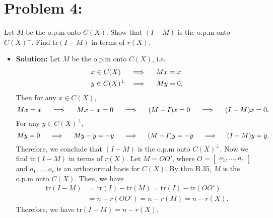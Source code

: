 \documentclass[11pt]{article}
\begin{document}
\section*{Problem 4:}
Let $M$ be the o.p.m onto $C(X)$.  Show that $(I-M)$ is the o.p.m onto $C(X)^\perp$.  Find tr$(I-M)$ in terms of $r(X)$.
\begin{itemize}
\item[] {\bf Solution:}  Let $M$ be the o.p.m onto $C(X)$, i.e. 
\begin{align*}
&x \in C(X) \hspace{5mm}\Longrightarrow\hspace{5mm} Mx = x \\
&y \in C(X)^\perp \hspace{3mm} \Longrightarrow\hspace{5mm} My = 0.
\end{align*}
Then for any $x\in C(X)$,
\[
Mx = x \hspace{5mm} \Longrightarrow\hspace{5mm} Mx - x = 0 \hspace{5mm}\Longrightarrow\hspace{5mm} (M-I)x = 0 \hspace{5mm}\Longrightarrow\hspace{5mm} (I-M)x=0.
\]
For any $y\in C(X)^\perp$,
\[
My = 0 \hspace{5mm} \Longrightarrow\hspace{5mm} My - y = -y \hspace{5mm} \Longrightarrow\hspace{5mm} (M-I)y = -y \hspace{5mm} \Longrightarrow\hspace{5mm} (I-M)y = y.
\]
Therefore, we conclude that $(I-M)$ is the o.p.m onto $C(X)^\perp$.  Now we find tr$(I-M)$ in terms of $r(X)$.  Let $M = OO'$, where $O = \begin{bmatrix}
o_1,...,o_r
\end{bmatrix}$ and $o_1,...,o_r$ is an orthonormal basis for $C(X)$.  By thm B.35, $M$ is the o.p.m onto $C(X)$.  Then, we have
\begin{align*}
\text{tr}(I-M) &= \text{tr}(I) - \text{tr}(M) = \text{tr}(I) - \text{tr}(OO') \\
&= n - r(OO') = n - r(M) = n - r(X).
\end{align*}
Therefore, we have tr$(I-M) = n-r(X)$.
\end{itemize}
\end{document}

